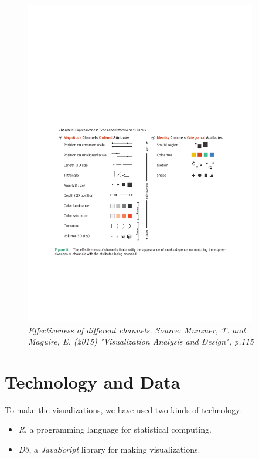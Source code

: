\documentclass[portrait, a0,30pt]{sciposter}
\begin{document}
\begin{multicols}{2}
\begin{mdframed}[backgroundcolor=white]
	\begin{figure}[]
		\center
		\includegraphics[width=0.9\textwidth,
		trim=80 323 75 327, clip]{fig/channels_marks_effectiveness}	
		\\	
		\textit{Effectiveness of different channels. 
		Source: Munzner, T. and Maguire, E. (2015) "Visualization Analysis and Design", p.115}
		\label{Fig:efficiency}
	\end{figure}
\end{mdframed}


\section*{Technology and Data}
\begin{mdframed}
To make the visualizations, we have used two kinds of technology:
\begin{itemize}
\item \hspace{10pt} \emph{R}, a programming language for statistical computing.
\item \hspace{10pt} \emph{D3}, a \emph{JavaScript} library for making visualizations.
\end{itemize}


\end{mdframed}
\end{multicols}
\end{document}
